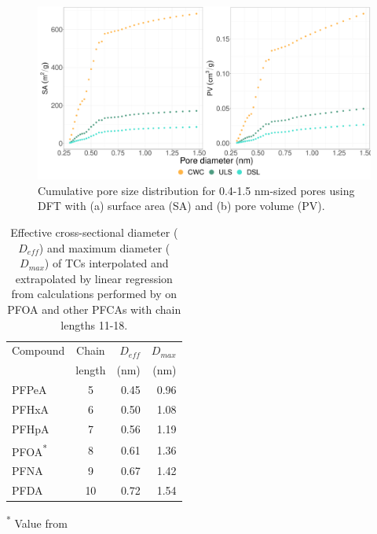 \begin{figure}[htb]
    \centering
    \includegraphics[width=\textwidth]{R/figs/PZD_SA_PV_small_plot.pdf}
    \caption{Cumulative pore size distribution for 0.4-1.5 nm-sized pores using DFT with (a) surface area (SA) and (b) pore volume (PV).}
    \label{fig:PZD_small}
\end{figure}

\begin{table}
\caption{Effective cross-sectional diameter ($D_{eff}$) and maximum diameter ($D_{max}$) of TCs interpolated and extrapolated by linear regression from calculations performed by \cite{inoue2012size} on PFOA and other PFCAs with chain lengths 11-18.}
\centering
\begin{threeparttable}
\label{tab:molecsize}
\begin{tabular}{lcrr}
\toprule
Compound & Chain & $D_{eff}$ & $D_{max}$ \\ 
& length & (nm) & (nm) \\ \midrule
PFPeA & 5  & 0.45  & 0.96  \\
PFHxA & 6  & 0.50  & 1.08  \\
PFHpA & 7  & 0.56  & 1.19  \\
PFOA\textsuperscript{*} & 8 & 0.61 & 1.36 \\
PFNA & 9 & 0.67 & 1.42  \\
PFDA & 10 & 0.72 & 1.54  \\ \bottomrule                                    
\end{tabular}
\begin{tablenotes}
\item \textsuperscript{*} Value from \cite{inoue2012size}
\end{tablenotes}
\end{threeparttable}
\end{table}

